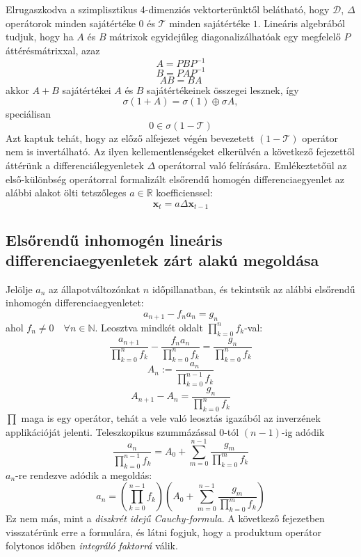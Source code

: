 \documentclass[14p]{article}
\begin{document}
\\
\\
Elrugaszkodva a szimplisztikus 4-dimenziós vektorterünktől belátható, hogy $\mathcal{D}$, $\Delta$ operátorok minden sajátértéke $0$ és $\mathcal{T}$ minden sajátértéke $1$. Lineáris algebrából tudjuk, hogy ha $A$ és $B$ mátrixok egyidejűleg diagonalizálhatóak egy megfelelő $P$ áttérésmátrixxal, azaz
\[
	A = PBP^{-1}
\] 
\[
	B = PAP^{-1}
\]
\[
	AB = BA
\]
akkor $A + B$ sajátértékei $A$ és $B$ sajátértékeinek összegei lesznek, így
\[
	\sigma(1 + A) = \sigma(1) \oplus \sigma{A},
\]
speciálisan
\[
	0 \in \sigma(1 - \mathcal{T})
\]
Azt kaptuk tehát, hogy az előző alfejezet végén bevezetett $(1 - \mathcal{T})$ operátor nem is invertálható. Az ilyen kellementlenségeket elkerülvén a következő fejezettől áttérünk a differenciálegyenletek $\Delta$ operátorral való felírására. Emlékeztetőül az első-különbség operátorral formalizált elsőrendű homogén differenciaegyenlet az alábbi alakot ölti tetszőleges $a \in \mathbb{R}$ koefficienssel:
\[
	\pmb{x}_t = a \Delta \pmb{x}_{t-1}
\]

\subsection[Elsőrendű egyenletek zárt megoldása]{Elsőrendű inhomogén lineáris differenciaegyenletek zárt alakú megoldása}

Jelölje $a_n$ az állapotváltozónkat $n$ időpillanatban, és tekintsük az alábbi elsőrendű inhomogén differenciaegyenletet:
\[
	a_{n+1} - f_n a_n = g_n
\]
ahol $f_n \ne 0 \quad \forall n \in \mathbb{N}$.
Leosztva mindkét oldalt $\prod_{k=0}^{n}{f_k}$-val:
\[
	\frac{a_{n+1}}{\prod_{k=0}^{n}{f_k}} - \frac{f_n a_n}{\prod_{k=0}^{n}{f_k}} = \frac{g_n}{\prod_{k=0}^{n}{f_k}}
\]
\[
	A_n := \frac{a_n}{\prod_{k=0}^{n-1}{f_k}}
\]
\[
	A_{n+1} - A_n = \frac{g_n}{\prod_{k=0}^{n}{f_k}}
\]
$\prod$ maga is egy operátor, tehát a vele való leosztás igazából az inverzének applikációját jelenti.
Teleszkopikus szummázással $0$-tól $(n-1)$-ig adódik
\[
	\frac{a_n}{\prod_{k=0}^{n-1}{f_k}} = A_0 + \sum_{m=0}^{n-1}{\frac{g_m}{\prod_{k=0}^{m}{f_k}}}
\]
$a_n$-re rendezve adódik a megoldás:
\[
	a_n = (\prod_{k=0}^{n-1}{f_k})(A_0 + \sum_{m=0}^{n-1}{\frac{g_m}{\prod_{k=0}^{m}{f_k}}})
\]
Ez nem más, mint a \emph{diszkrét idejű Cauchy-formula}. A következő fejezetben visszatérünk erre a formulára, és látni fogjuk, hogy a produktum operátor folytonos időben \emph{integráló faktorrá} válik.
\end{document}
